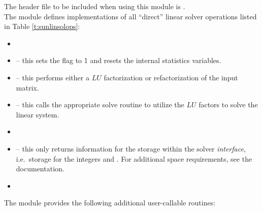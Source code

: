 \noindent The header file to be included when using this module 
is . \\
The {\sunlinsolslumt} module defines implementations of all
``direct'' linear solver operations listed in
Table \ref{t:sunlinsolops}:
\begin{itemize}
\item {}
\item {} -- this sets the
   flag to 1 and resets the internal {\superlumt}
  statistics variables.
\item {} -- this performs either a $LU$
  factorization or refactorization of the input matrix.
\item {} -- this calls the appropriate
  {\superlumt} solve routine to utilize the $LU$ factors to solve the
  linear system. 
\item {}
\item {} -- this only returns information for
  the storage within the solver \emph{interface}, i.e.~storage for the
  integers  and .  For additional
  space requirements, see the {\superlumt} documentation.
\item {}
\end{itemize}
The module {\sunlinsolslumt} provides the following additional
user-callable routines: 

